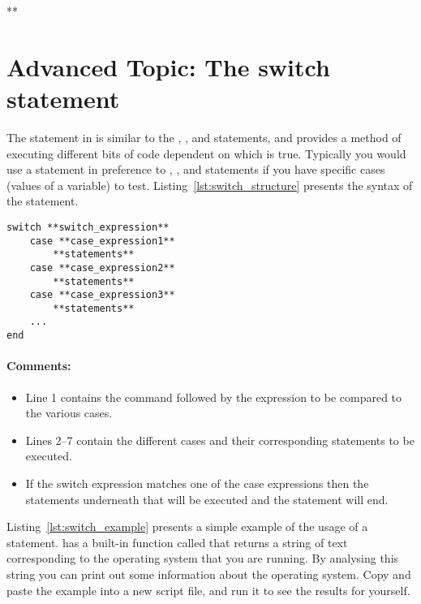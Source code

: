**\chapter{Advanced Topic: The switch statement}\label{chap:switch}

The  statement in \mlab is similar to the , , and  statements, and provides a method of executing different bits of code dependent on which  is true. Typically you would use a  statement in preference to , , and  statements if you have specific cases (values of a variable) to test. Listing~\ref{lst:switch_structure} presents the syntax of the  statement. 
\begin{lstlisting}[caption={Syntax of a \mcode{switch} statement},label=lst:switch_structure]
switch **switch_expression**
	case **case_expression1**
		**statements**
	case **case_expression2**
		**statements**
	case **case_expression3**
		**statements**
	...
end
\end{lstlisting}

\subsubsection{Comments:}
\begin{itemize}
\item Line 1 contains the  command followed by the expression to be compared to the various cases.
\item Lines 2--7 contain the different cases and their corresponding statements to be executed.
\item If the switch expression matches one of the case expressions then the statements underneath that  will be executed and the  statement will end.
\end{itemize}

Listing~\ref{lst:switch_example} presents a simple example of the usage of a  statement. \mlab has a built-in function called  that returns a string of text corresponding to the operating system that you are running. By analysing this string you can print out some information about the operating system. Copy and paste the example into a new script file, and run it to see the results for yourself.

\newpage

